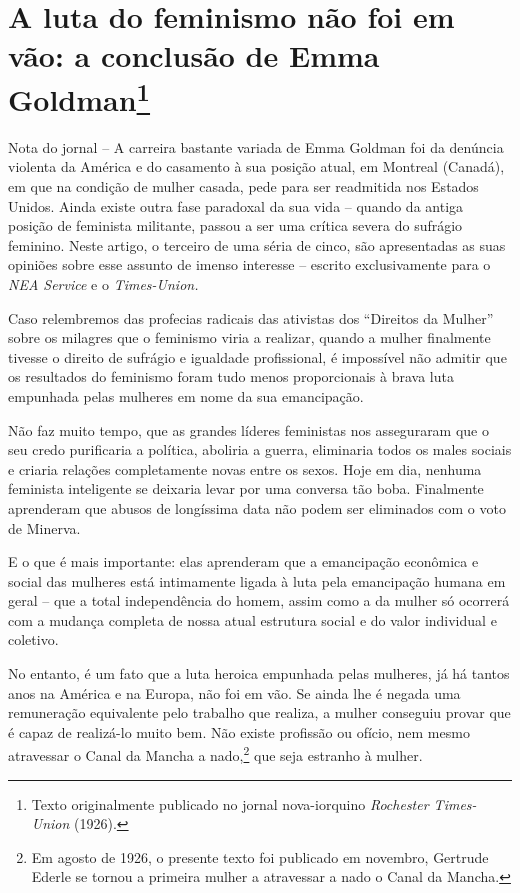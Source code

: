 \chapter[A luta do feminismo não foi em vão (1926)]{A luta do feminismo não foi em vão: a conclusão de Emma Goldman\footnote[*]{Texto originalmente publicado no
  jornal nova-iorquino \emph{Rochester Times-Union} (1926).}}

Nota do jornal -- A carreira bastante variada de Emma Goldman foi da
denúncia violenta da América e do casamento à sua posição atual, em
Montreal (Canadá), em que na condição de mulher casada, pede para ser
readmitida nos Estados Unidos. Ainda existe outra fase paradoxal da sua
vida -- quando da antiga posição de feminista militante, passou a ser
uma crítica severa do sufrágio feminino. Neste artigo, o terceiro de uma
séria de cinco, são apresentadas as suas opiniões sobre esse assunto de
imenso interesse -- escrito exclusivamente para o \emph{NEA Service} e o
\emph{Times-Union.}

\asterisc

Caso relembremos das profecias radicais das ativistas dos ``Direitos da
Mulher'' sobre os milagres que o feminismo viria a realizar, quando a
mulher finalmente tivesse o direito de sufrágio e igualdade
profissional, é impossível não admitir que os resultados do feminismo
foram tudo menos proporcionais à brava luta empunhada pelas mulheres em
nome da sua emancipação.

Não faz muito tempo, que as grandes líderes feministas nos asseguraram
que o seu credo purificaria a política, aboliria a guerra, eliminaria
todos os males sociais e criaria relações completamente novas entre os
sexos. Hoje em dia, nenhuma feminista inteligente se deixaria levar por
uma conversa tão boba. Finalmente aprenderam que abusos de longíssima
data não podem ser eliminados com o voto de Minerva.

E o que é mais importante: elas aprenderam que a emancipação econômica e
social das mulheres está intimamente ligada à luta pela emancipação
humana em geral -- que a total independência do homem, assim como a da
mulher só ocorrerá com a mudança completa de nossa atual estrutura
social e do valor individual e coletivo.

No entanto, é um fato que a luta heroica empunhada pelas mulheres, já há
tantos anos na América e na Europa, não foi em vão. Se ainda lhe é
negada uma remuneração equivalente pelo trabalho que realiza, a mulher
conseguiu provar que é capaz de realizá-lo muito bem. Não existe
profissão ou ofício, nem mesmo atravessar o Canal da Mancha a
nado,\footnote{Em agosto de 1926, o presente texto foi publicado em
  novembro, Gertrude Ederle se tornou a primeira mulher a atravessar a
  nado o Canal da Mancha.} que seja estranho à mulher.

